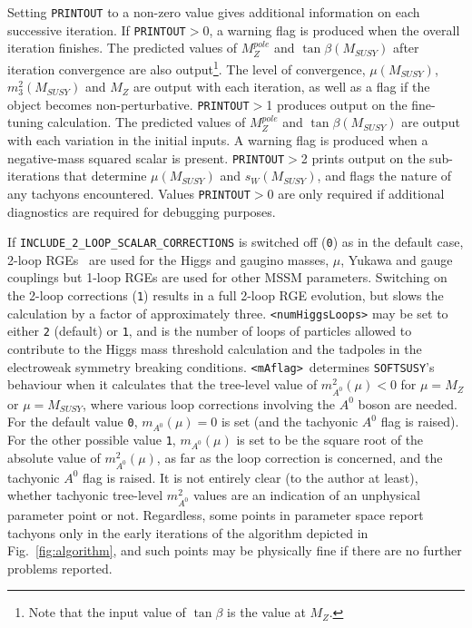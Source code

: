\documentclass{article}
\def\SOFTSUSY{{\tt SOFTSUSY}}
\def\code#1{\small{\tt #1}\normalsize}
\begin{document}
Setting \code{PRINTOUT} to a non-zero value gives additional information
on 
each successive iteration. If \code{PRINTOUT}$>$0, a warning flag is
produced when the overall iteration 
finishes. The predicted values of $M_Z^{pole}$ and $\tan \beta(M_{SUSY})$ after
iteration convergence
are also output\footnote{Note that the input value of $\tan \beta$ is the
value at $M_Z$.}. The level of convergence, $\mu(M_{SUSY})$, $m_3^2(M_{SUSY})$ and $M_Z$
are output with each iteration, as well as a flag if the object becomes
non-perturbative. 
\code{PRINTOUT}$>$1 produces output on the fine-tuning calculation. The
predicted values of $M_Z^{pole}$ and $\tan \beta(M_{SUSY})$ are output with each
variation 
in the initial inputs. A warning flag is produced when a
negative-mass squared scalar is present.
\code{PRINTOUT}$>$2 prints output on the sub-iterations that determine
$\mu(M_{SUSY})$ and $s_W(M_{SUSY})$, and flags the nature of any tachyons
encountered. Values \code{PRINTOUT}$>$0 are only required
if additional diagnostics are required for debugging purposes.

If \code{INCLUDE\_2\_LOOP\_SCALAR\_CORRECTIONS} is switched off (\code{0}) as
in the default case, 
2-loop RGEs~\cite{mandv}
 are used for the Higgs and gaugino masses, $\mu$, Yukawa and gauge
couplings but  
1-loop RGEs are used for other MSSM parameters. Switching on the 2-loop
corrections (\code{1})
results in a full 2-loop RGE evolution, but slows the calculation by a factor
of approximately three.
\code{<numHiggsLoops>} may be set to either \code{2} (default) or \code{1},
and is the number of loops of particles allowed to contribute to the Higgs
mass threshold calculation and the tadpoles in the electroweak symmetry
breaking conditions.
\code{<mAflag>}~determines \SOFTSUSY's behaviour when it calculates that the
tree-level value of $m_{A^0}^2(\mu)<0$ for $\mu=M_Z$ or $\mu=M_{SUSY}$, where
various loop corrections involving the 
$A^0$ boson are needed. For the default value \code{0}, $m_{A^0}(\mu)=0$ is
set (and the tachyonic $A^0$ flag is raised). For the other possible value
\code{1}, $m_{A^0}(\mu)$ is set to be the square root of the absolute value of
$m_{A^0}^2(\mu)$, as far as the loop correction is concerned, and the
tachyonic $A^0$ flag is raised. It is not entirely clear (to the author at
least), whether tachyonic tree-level $m_{A^0}^2$ values are an indication of
an unphysical parameter point or not. Regardless, some points in parameter
space report tachyons only in the 
early iterations of the algorithm depicted in Fig.~\ref{fig:algorithm},
 and such points may
be physically fine if there are no further problems reported. 
\end{document}
